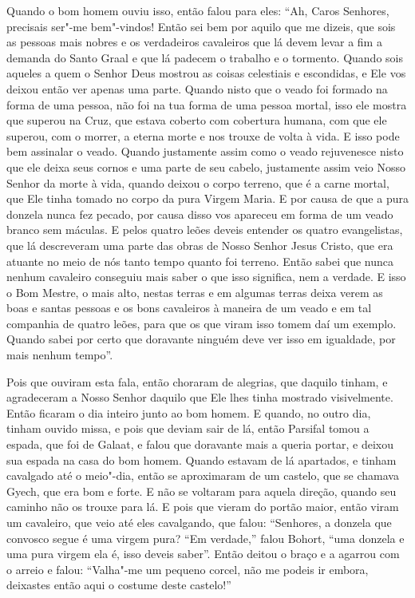 Quando o bom homem ouviu isso, então falou para eles: “Ah, Caros Senhores,
precisais ser"-me bem"-vindos! Então sei bem por aquilo que me dizeis, que sois
as pessoas mais nobres e os verdadeiros cavaleiros que lá devem levar a fim a
demanda do Santo Graal e que lá padecem o trabalho e o tormento. Quando sois
aqueles a quem o Senhor Deus mostrou as coisas celestiais e escondidas, e Ele
vos deixou então ver apenas uma parte. Quando nisto que o veado foi formado na
forma de uma pessoa, não foi na tua forma de uma pessoa mortal, isso ele mostra
que superou na Cruz, que estava coberto com cobertura humana, com que ele
superou, com o morrer, a eterna morte e nos trouxe de volta à vida. E isso pode
bem assinalar o veado. Quando justamente assim como o veado rejuvenesce nisto
que ele deixa seus cornos e uma parte de seu cabelo, justamente assim veio
Nosso Senhor da morte à vida, quando deixou o corpo terreno, que é a carne
mortal, que Ele tinha tomado no corpo da pura Virgem Maria. E por causa de que
a pura donzela nunca fez pecado, por causa disso vos apareceu em forma de um
veado branco sem máculas. E pelos quatro leões deveis entender os quatro
evangelistas, que lá descreveram uma parte das obras de Nosso Senhor Jesus
Cristo, que era atuante no meio de nós  tanto tempo quanto foi terreno. Então
sabei que nunca nenhum cavaleiro conseguiu mais saber o que isso significa, nem
a verdade. E isso o Bom Mestre, o mais alto, nestas terras e em algumas terras
deixa verem as boas e santas pessoas e os bons cavaleiros à maneira de um veado
e em tal companhia de quatro leões, para que os que viram isso tomem daí um
exemplo. Quando sabei por certo que doravante ninguém deve ver isso em
igualdade, por mais nenhum tempo”. 

Pois que ouviram esta fala, então choraram de alegrias, que daquilo tinham, e
agradeceram a Nosso Senhor daquilo que Ele lhes tinha mostrado visivelmente.
Então ficaram o dia inteiro junto ao bom homem. E quando, no outro dia, tinham
ouvido missa, e pois que deviam sair de lá, então Parsifal tomou a espada, que
foi de Galaat, e falou que doravante mais a queria portar, e deixou sua espada
na casa do bom homem. Quando estavam de lá apartados, e tinham cavalgado até o
meio"-dia, então se aproximaram de um castelo, que se chamava Gyech, que era bom
e forte. E não se voltaram para aquela direção, quando seu caminho não os
trouxe para lá. E pois que vieram do portão maior, então viram um cavaleiro,
que veio até eles cavalgando, que falou: “Senhores, a donzela que convosco
segue é uma virgem pura? “Em verdade,” falou Bohort, “uma donzela e uma pura
virgem ela é, isso deveis saber”. Então deitou o braço e a agarrou com o arreio
e falou: “Valha"-me um pequeno corcel, não me podeis ir embora, deixastes então
aqui o costume deste castelo!” 

